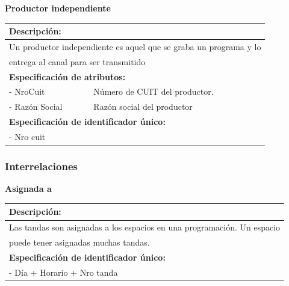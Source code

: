 \documentclass[a4paper,10pt]{article}
\begin{document}
      \begin{flushleft}
      \begin{large} \bf{Productor independiente} \end{large}
    \end{flushleft}
      \begin{tabular}{| p{2cm} | p{9cm} |}
	\hline
	\multicolumn{2}{|l|}{\bf{Descripci\'on:}} \\
	\hline
	\multicolumn{2}{|l|}{Un productor independiente es aquel que se graba un programa y lo} \\
	\multicolumn{2}{|l|}{entrega al canal para ser transmitido} \\	
	\hline	
	\multicolumn{2}{|l|}{\bf{Especificaci\'on de atributos:}} \\
	\hline
	- NroCuit & N\'umero de CUIT del productor. \\
	\hline \hline
	- Raz\'on \newline Social & Raz\'on social del productor\\
	\hline
	\multicolumn{2}{|l|}{\bf{Especificaci\'on de identificador \'unico:}} \\
	\hline
	\multicolumn{2}{|l|}{- Nro cuit} \\
	\hline
      \end{tabular} 
   
   
    \subsubsection{Interrelaciones}
    
    \begin{flushleft}
      \begin{large} \bf{Asignada a} \end{large}
    \end{flushleft}
      \begin{tabular}{| p{2cm} | p{9cm} |}
	\hline
	\multicolumn{2}{|l|}{\bf{Descripci\'on:}} \\
	\hline
	\multicolumn{2}{|l|}{Las tandas son asignadas a los espacios en una programaci\'on. Un espacio} \\
	\multicolumn{2}{|l|}{puede tener asignadas muchas tandas.} \\	
	\hline	
	\multicolumn{2}{|l|}{\bf{Especificaci\'on de identificador \'unico:}} \\
	\hline
	\multicolumn{2}{|l|}{- D\'ia + Horario + Nro tanda} \\
	\hline
      \end{tabular}
\end{document}
